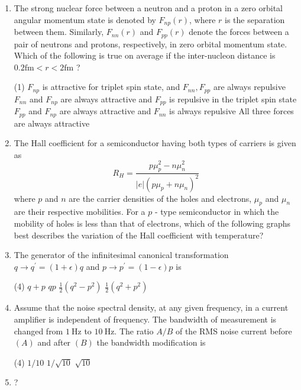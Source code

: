 \begin{enumerate}
\item The strong nuclear force between a neutron and a proton in a zero orbital angular momentum state is denoted by $F_{n p}(r)$, where $r$ is the separation between them. Similarly, $F_{n n}(r)$ and $F_{p p}(r)$ denote the forces between a pair of neutrons and protons, respectively, in zero orbital momentum state. Which of the following is true on average if the inter-nucleon distance is $0.2 \mathrm{fm}<r<2 \mathrm{fm}$ ?
 \begin{tasks}(1)
	\task[\textbf{a.}]$F_{n p}$ is attractive for triplet spin state, and $F_{n n}, F_{p p}$ are always repulsive
	\task[\textbf{b.}]$F_{n n}$ and $F_{n p}$ are always attractive and $F_{p p}$ is repulsive in the triplet spin state
	\task[\textbf{c.}] $F_{p p}$ and $F_{n p}$ are always attractive and $F_{n n}$ is always repulsive
	\task[\textbf{d.}] All three forces are always attractive
\end{tasks}
\item The Hall coefficient for a semiconductor having both types of carriers is given as
$$
R_{H}=\frac{p \mu_{p}^{2}-n \mu_{n}^{2}}{|e|\left(p \mu_{p}+n \mu_{n}\right)^{2}}
$$
where $p$ and $n$ are the carrier densities of the holes and electrons, $\mu_{p}$ and $\mu_{n}$ are their respective mobilities. For a $p$ - type semiconductor in which the mobility of holes is less than that of electrons, which of the following graphs best describes the variation of the Hall coefficient with temperature?	
\item The generator of the infinitesimal canonical transformation $q \rightarrow q^{\prime}=(1+\epsilon) q$ and $p \rightarrow p^{\prime}=(1-\epsilon) p$ is
 \begin{tasks}(4)
	\task[\textbf{a.}]$q+p$
	\task[\textbf{b.}]$q p$
	\task[\textbf{c.}]$\frac{1}{2}\left(q^{2}-p^{2}\right)$
	\task[\textbf{d.}] $\frac{1}{2}\left(q^{2}+p^{2}\right)$
\end{tasks}
\item Assume that the noise spectral density, at any given frequency, in a current amplifier is independent of frequency. The bandwidth of measurement is changed from $1 \mathrm{~Hz}$ to $10 \mathrm{~Hz}$. The ratio $A / B$ of the RMS noise current before $(A)$ and after $(B)$ the bandwidth modification is
 \begin{tasks}(4)
	\task[\textbf{a.}]$1 / 10$
	\task[\textbf{b.}] $1 / \sqrt{10}$
	\task[\textbf{c.}]$\sqrt{10}$
\end{tasks}
\item ?

\end{enumerate}
